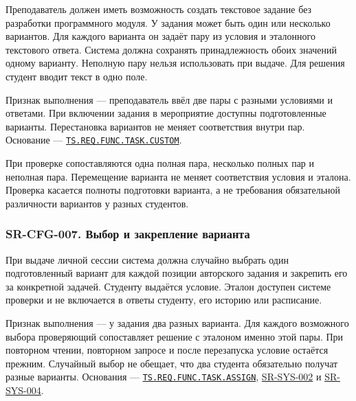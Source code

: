 \documentclass[12pt,a4paper]{article}
\begin{document}
\hypertarget{sr-cfg-006-авторское-задание-с-вариантами}{}

\hypertarget{sr-cfg-006}{}

Преподаватель должен иметь возможность создать текстовое задание без разработки программного модуля. У задания может быть один или несколько вариантов. Для каждого варианта он задаёт пару из условия и эталонного текстового ответа. Система должна сохранять принадлежность обоих значений одному варианту. Неполную пару нельзя использовать при выдаче. Для решения студент вводит текст в одно поле.

Признак выполнения --- преподаватель ввёл две пары с разными условиями и ответами. При включении задания в мероприятие доступны подготовленные варианты. Перестановка вариантов не меняет соответствия внутри пар. Основание --- {\href{../02\_Техническое\_задание/Техническое\_задание.pdf\#ts-req-func-task-custom}{\texttt{TS.\allowbreak{}REQ.\allowbreak{}FUNC.\allowbreak{}TASK.\allowbreak{}CUSTOM}}}.

При проверке сопоставляются одна полная пара, несколько полных пар и неполная пара. Перемещение варианта не меняет соответствия условия и эталона. Проверка касается полноты подготовки варианта, а не требования обязательной различности вариантов у разных студентов.

\subsubsection{SR-CFG-007. Выбор и закрепление варианта}\label{sr-cfg-007-ux432ux44bux431ux43eux440-ux438-ux437ux430ux43aux440ux435ux43fux43bux435ux43dux438ux435-ux432ux430ux440ux438ux430ux43dux442ux430}

\hypertarget{sr-cfg-007-выбор-и-закрепление-варианта}{}

\hypertarget{sr-cfg-007}{}

При выдаче личной сессии система должна случайно выбрать один подготовленный вариант для каждой позиции авторского задания и закрепить его за конкретной задачей. Студенту выдаётся условие. Эталон доступен системе проверки и не включается в ответы студенту, его историю или расписание.

Признак выполнения --- у задания два разных варианта. Для каждого возможного выбора проверяющий сопоставляет решение с эталоном именно этой пары. При повторном чтении, повторном запросе и после перезапуска условие остаётся прежним. Случайный выбор не обещает, что два студента обязательно получат разные варианты. Основания --- {\href{../02\_Техническое\_задание/Техническое\_задание.pdf\#ts-req-func-task-assign}{\texttt{TS.\allowbreak{}REQ.\allowbreak{}FUNC.\allowbreak{}TASK.\allowbreak{}ASSIGN}}}, {\hyperlink{sr-sys-002}{SR-SYS-002}} и {\hyperlink{sr-sys-004}{SR-SYS-004}}.
\end{document}
